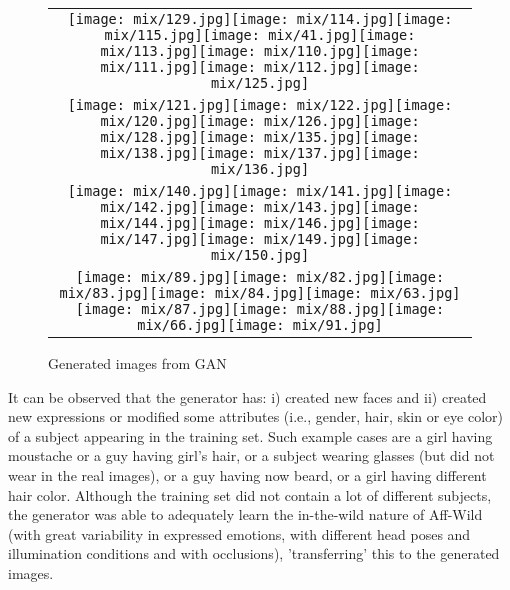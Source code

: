 \documentclass[a4paper, 10pt, conference]{ieeeconf}      %
\begin{document}
\begin{figure}[h]
\begin{tabular}{ c  }
\texttt{[image: mix/129.jpg]}\texttt{[image: mix/114.jpg]}\texttt{[image: mix/115.jpg]}\texttt{[image: mix/41.jpg]}\texttt{[image: mix/113.jpg]}\texttt{[image: mix/110.jpg]}\texttt{[image: mix/111.jpg]}\texttt{[image: mix/112.jpg]}\texttt{[image: mix/125.jpg]}\\

\texttt{[image: mix/121.jpg]}\texttt{[image: mix/122.jpg]}\texttt{[image: mix/120.jpg]}\texttt{[image: mix/126.jpg]}\texttt{[image: mix/128.jpg]}\texttt{[image: mix/135.jpg]}\texttt{[image: mix/138.jpg]}\texttt{[image: mix/137.jpg]}\texttt{[image: mix/136.jpg]}\\

\texttt{[image: mix/140.jpg]}\texttt{[image: mix/141.jpg]}\texttt{[image: mix/142.jpg]}\texttt{[image: mix/143.jpg]}\texttt{[image: mix/144.jpg]}\texttt{[image: mix/146.jpg]}\texttt{[image: mix/147.jpg]}\texttt{[image: mix/149.jpg]}\texttt{[image: mix/150.jpg]}\\

\texttt{[image: mix/89.jpg]}\texttt{[image: mix/82.jpg]}\texttt{[image: mix/83.jpg]}\texttt{[image: mix/84.jpg]}\texttt{[image: mix/63.jpg]}\texttt{[image: mix/87.jpg]}\texttt{[image: mix/88.jpg]}\texttt{[image: mix/66.jpg]}\texttt{[image: mix/91.jpg]}\\


\end{tabular}
\caption{Generated images from GAN}
\label{synthetic}
\end{figure}


 It can be observed that the generator has: i) created new faces and ii) created new expressions or modified some attributes (i.e., gender, hair, skin or eye color) of a subject appearing in the training set. Such example cases are a girl having moustache or a guy having girl's hair, or a subject wearing glasses (but did not wear in the real images), or a guy having now beard, or a girl having different hair color. Although the training set did not contain a lot of different subjects, the generator was able to adequately learn the in-the-wild nature of Aff-Wild (with great variability in expressed emotions, with different head poses and illumination conditions and with occlusions), 'transferring' this to the generated images.
\end{document}
